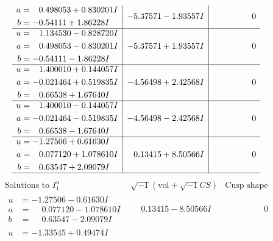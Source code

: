 \documentclass[1p]{elsarticle_modified}
\theoremstyle{definition}
\newcommand{\I}{\sqrt{-1}}
\begin{document}
$$\begin{array}{c|c|c}
\begin{aligned}
a &= \phantom{-}0.498053 + 0.830201 I \\
b &= -0.54111 + 1.86228 I\end{aligned}
 & -5.37571 - 1.93557 I & \phantom{-0.000000 } 0 \\ \hline\begin{aligned}
u &= \phantom{-}1.134530 - 0.828720 I \\
a &= \phantom{-}0.498053 - 0.830201 I \\
b &= -0.54111 - 1.86228 I\end{aligned}
 & -5.37571 + 1.93557 I & \phantom{-0.000000 } 0 \\ \hline\begin{aligned}
u &= \phantom{-}1.400010 + 0.144057 I \\
a &= -0.021464 + 0.519835 I \\
b &= \phantom{-}0.66538 + 1.67640 I\end{aligned}
 & -4.56498 + 2.42568 I & \phantom{-0.000000 } 0 \\ \hline\begin{aligned}
u &= \phantom{-}1.400010 - 0.144057 I \\
a &= -0.021464 - 0.519835 I \\
b &= \phantom{-}0.66538 - 1.67640 I\end{aligned}
 & -4.56498 - 2.42568 I & \phantom{-0.000000 } 0 \\ \hline\begin{aligned}
u &= -1.27506 + 0.61630 I \\
a &= \phantom{-}0.077120 + 1.078610 I \\
b &= \phantom{-}0.63547 + 2.09079 I\end{aligned}
 & \phantom{-}0.13415 + 8.50566 I & \phantom{-0.000000 } 0\\
 \hline 
 \end{array}$$\newpage$$\begin{array}{c|c|c}  
\text{Solutions to }I^u_{1}& \I (\text{vol} + \sqrt{-1}CS) & \text{Cusp shape}\\
 \hline 
\begin{aligned}
u &= -1.27506 - 0.61630 I \\
a &= \phantom{-}0.077120 - 1.078610 I \\
b &= \phantom{-}0.63547 - 2.09079 I\end{aligned}
 & \phantom{-}0.13415 - 8.50566 I & \phantom{-0.000000 } 0 \\ \hline\begin{aligned}
u &= -1.33545 + 0.49474 I \\

\end{aligned}
\end{array}$$
\end{document}
